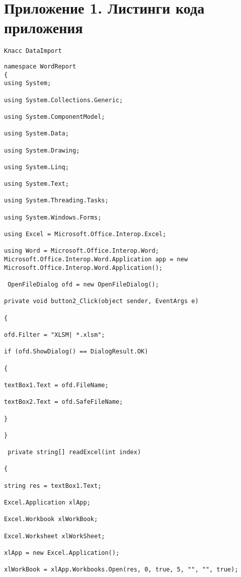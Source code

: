 \chapter*{Приложение 1. Листинги кода приложения}


\begin{verbatim}
Класс DataImport
\end{verbatim}

\begin{lstlisting}
namespace WordReport
{
using System;

using System.Collections.Generic;

using System.ComponentModel;

using System.Data;

using System.Drawing;

using System.Linq;

using System.Text;

using System.Threading.Tasks;

using System.Windows.Forms;

using Excel = Microsoft.Office.Interop.Excel;

using Word = Microsoft.Office.Interop.Word; 
Microsoft.Office.Interop.Word.Application app = new Microsoft.Office.Interop.Word.Application();

 OpenFileDialog ofd = new OpenFileDialog();

private void button2_Click(object sender, EventArgs e)

{

ofd.Filter = "XLSM| *.xlsm";

if (ofd.ShowDialog() == DialogResult.OK)

{

textBox1.Text = ofd.FileName;

textBox2.Text = ofd.SafeFileName;

}

} 

 private string[] readExcel(int index)

{

string res = textBox1.Text;

Excel.Application xlApp;

Excel.Workbook xlWorkBook;

Excel.Worksheet xlWorkSheet;

xlApp = new Excel.Application();

xlWorkBook = xlApp.Workbooks.Open(res, 0, true, 5, "", "", true);


\end{lstlisting}
